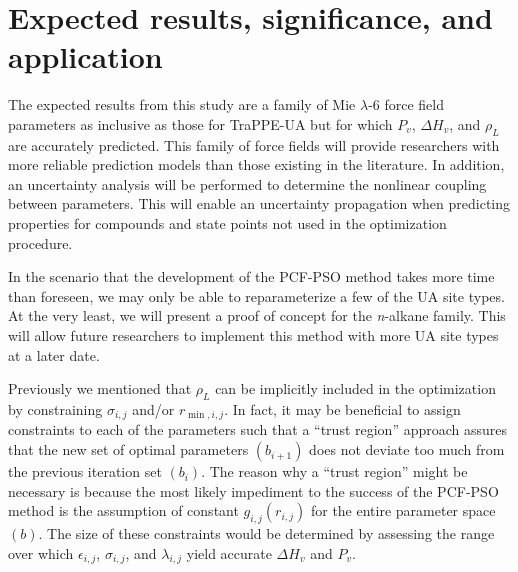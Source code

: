\documentclass[12pt]{article}
\begin{document}
\section{Expected results, significance, and application}

The expected results from this study are a family of Mie $\lambda$-6 force field parameters as inclusive as those for TraPPE-UA but for which $P_v$, $\Delta H_v$, and $\rho_L$ are accurately predicted. This family of force fields will provide researchers with more reliable prediction models than those existing in the literature. In addition, an uncertainty analysis will be performed to determine the nonlinear coupling between parameters. This will enable an uncertainty propagation when predicting properties for compounds and state points not used in the optimization procedure.

In the scenario that the development of the PCF-PSO method takes more time than foreseen, we may only be able to reparameterize a few of the UA site types. At the very least, we will present a proof of concept for the \textit{n}-alkane family. This will allow future researchers to implement this method with more UA site types at a later date.  

Previously we mentioned that $\rho_L$ can be implicitly included in the optimization by constraining $\sigma_{i,j}$ and/or $r_{\min,i,j}$. In fact, it may be beneficial to assign constraints to each of the parameters such that a ``trust region'' approach assures that the new set of optimal parameters $(b_{i+1})$ does not deviate too much from the previous iteration set $(b_i)$. The reason why a ``trust region'' might be necessary is because the most likely impediment to the success of the PCF-PSO method is the assumption of constant $g_{i,j}(r_{i,j})$ for the entire parameter space $(b)$. The size of these constraints would be determined by assessing the range over which $\epsilon_{i,j}$, $\sigma_{i,j}$, and $\lambda_{i,j}$ yield accurate $\Delta H_v$ and $P_v$.
\end{document}
